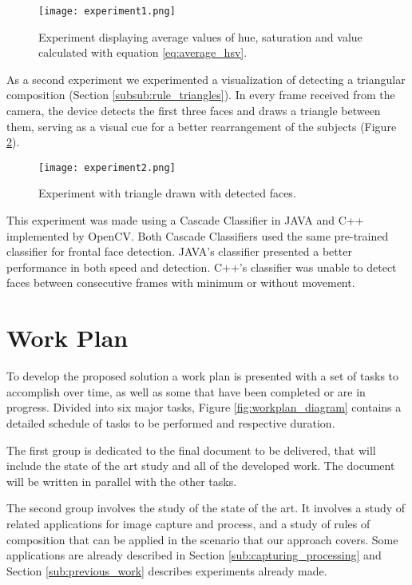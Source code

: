 \begin{figure}[htbp]
    \centering
    \texttt{[image: experiment1.png]}
	\caption{Experiment displaying average values of hue, saturation and value calculated with equation \ref{eq:average_hsv}\cite{datta2006studying}.}
	\label{fig:experiment1}
\end{figure}

As a second experiment we experimented a visualization of detecting a triangular composition (Section \ref{subsub:rule_triangles}). In every frame received from the camera, the device detects the first three faces and draws a triangle between them, serving as a visual cue for a better rearrangement of the subjects (Figure \ref{fig:experiment2}).

\begin{figure}[htbp]
    \centering
    \texttt{[image: experiment2.png]}
	\caption{Experiment with triangle drawn with detected faces.}
	\label{fig:experiment2}
\end{figure}

This experiment was made using a Cascade Classifier in JAVA and C++ implemented by OpenCV. Both Cascade Classifiers used the same pre-trained classifier for frontal face detection. JAVA's classifier presented a better performance in both speed and detection. C++'s classifier was unable to detect faces between consecutive frames with minimum or without movement.

\section{Work Plan}
\label{sub:work_plan}

To develop the proposed solution a work plan is presented with a set of tasks to accomplish over time, as well as some that have been completed or are in progress. Divided into six major tasks, Figure \ref{fig:workplan_diagram} contains a detailed schedule of tasks to be performed and respective duration.

The first group is dedicated to the final document to be delivered, that will include the state of the art study and all of the developed work. The document will be written in parallel with the other tasks.

The second group involves the study of the state of the art. It involves a study of related applications for image capture and process, and a study of rules of composition that can be applied in the scenario that our approach covers. Some applications are already described in Section \ref{sub:capturing_processing} and Section \ref{sub:previous_work} describes experiments already made.

